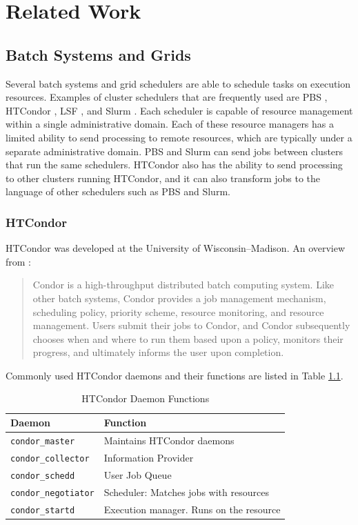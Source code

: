 \chapter{Related Work}
\label{chapter:relatedwork}

\section{Batch Systems and Grids}


Several batch systems and grid schedulers are able to schedule tasks on execution resources.  Examples of cluster schedulers that are frequently used are PBS \cite{pbstorque}, \mbox{HTCondor} \cite{litzkow1988condor}, LSF \cite{computinglsf},  and Slurm \cite{yoo2003slurm}.  Each scheduler is capable of resource management within a single administrative domain.  Each of these resource managers has a limited ability to send processing to remote resources, which are typically under a separate administrative domain.  PBS and Slurm can send jobs between clusters that run the same schedulers.  HTCondor also has the ability to send processing to other clusters running HTCondor, and it can also transform jobs to the language of other schedulers such as PBS and Slurm.

\subsection{HTCondor}
HTCondor was developed at the University of Wisconsin--Madison.  An overview from \cite{thain2005distributed}:
\begin{quotation}
	Condor is a high-throughput distributed batch computing system.  Like other batch systems, Condor provides a job management mechanism, scheduling policy, priority scheme, resource monitoring, and resource management.  Users submit their jobs to Condor, and Condor subsequently chooses when and where to run them based upon a policy, monitors their progress, and ultimately informs the user upon completion.  
\end{quotation}

Commonly used HTCondor daemons and their functions are listed in Table \ref{table:condordaemons}.

\begin{table}[h!t]
	\centering
	\begin{tabular}{| l | l |}
		\hline
		Daemon & Function \\
		\hline \hline
		\texttt{condor\_master} & Maintains HTCondor daemons   \\ \hline
		\texttt{condor\_collector} & Information Provider \\ \hline
		\texttt{condor\_schedd} & User Job Queue \\ \hline
		\texttt{condor\_negotiator} & Scheduler: Matches jobs with resources \\ \hline
		\texttt{condor\_startd} & Execution manager.  Runs on the resource \\ \hline
	\end{tabular}
	\caption{HTCondor Daemon Functions} \label{table:condordaemons}
\end{table}

